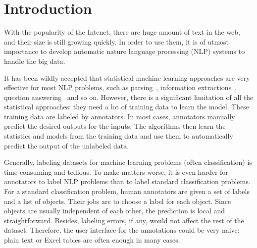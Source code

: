 \section{Introduction}

With the popularity of the Intenet, there are huge amount of text in the web, and their size is still growing quickly. In order to use them, it is of utmost importance to develop automatic nature language processing (NLP) systems to handle the big data. 


It has been wildly accepted that statistical machine learning approaches are very effective for most NLP problems, such as parsing~\cite{klein2003accurate}, information extractions~\cite{banko2007open}, question answering~\cite{kwok2001scaling} and so on. However, there is a significant limitation of all the statistical approaches: they need a lot of training data to learn the model. These training data are labeled by annotators. In most cases, annotators manually predict the desired outputs for the inputs. The algorithms then learn the statistics and models from the training data and use them to automatically predict the output of the unlabeled data.   

Generally, labeling datasets for machine learning problems (often classification) is time consuming and tedious. To make matters worse, it is even harder for annotators to label NLP problems than to label standard classification problems. For a standard classification problem, human annotators are given a set of labels and a list of objects. Their jobs are to choose a label for each object. Since objects are usually independent of each other, the prediction is local and straightforward. Besides, labeling errors, if any, would not affect the rest of the dataset. Therefore, the user interface for the annotations could be very naive: plain text or Excel tables are often enough in many cases. 


